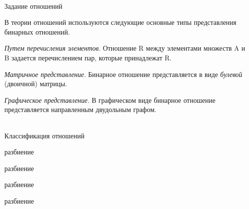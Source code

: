 \begin{frame}{\\Задание отношений}
	
	
	
	\topline
	\justifying
	
	В теории отношений используются следующие основные типы представления бинарных отношений.\\
	
	\begin{textitemize}
		\item \textit{Путем перечисления элементов}. Отношение R между элементами множеств A и B задается перечислением пар, которые принадлежат R.
		
		\item
		\textit{Матричное представление}. Бинарное отношение представляется в виде \textit{булевой} (двоичной) матрицы.
		
		\item \textit{Графическое представление}. В графическом виде бинарное отношение представляется направленным двудольным графом.
		
	\end{textitemize}
	
\end{frame}

\begin{frame}{\\Классификация отношений}
	
	\topline
	\justifying
	\footnotesize
	
	\begin{SCn}
		
		\begin{scnrelfromset}{разбиение}
		\end{scnrelfromset}
		
		\begin{scnrelfromset}{разбиение}
		\end{scnrelfromset}
		
		\begin{scnrelfromset}{разбиение}
		\end{scnrelfromset}
		
		\begin{scnrelfromset}{разбиение}
		\end{scnrelfromset}
		
	\end{SCn}
\vspace{-2em}
\end{frame}

